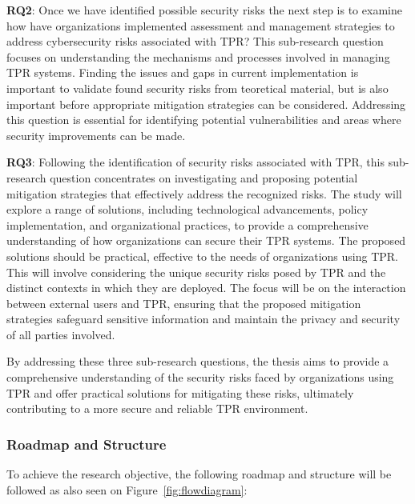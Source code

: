 \textbf{RQ2}: Once we have identified possible security risks the next step is to examine how have organizations implemented assessment
and management strategies to address cybersecurity risks associated with \ac{TPR}? This sub-research question focuses on understanding
the mechanisms and processes involved in managing \ac{TPR} systems. Finding the issues and gaps in current implementation is important to validate found security risks from teoretical material, but is also important before appropriate mitigation strategies can be considered. Addressing this question is essential for identifying potential vulnerabilities and areas where security improvements can be made.

\textbf{RQ3}: Following the identification of security risks associated with \ac{TPR}, this sub-research question concentrates on investigating and proposing potential mitigation strategies that effectively address the recognized risks. The study will explore a range of solutions, including technological advancements, policy implementation, and organizational practices, to provide a comprehensive understanding of how organizations can secure their \ac{TPR} systems. The proposed solutions should be practical, effective to the needs of organizations using \ac{TPR}.
  This will involve considering the unique security risks posed by \ac{TPR} and the distinct contexts in which they are deployed.
  The focus will be on the interaction between external users and \ac{TPR}, ensuring that the proposed mitigation strategies safeguard sensitive information and maintain the privacy and security of all parties involved.


By addressing these three sub-research questions, the thesis aims to provide a comprehensive understanding of the security risks faced by
organizations using \ac{TPR} and offer practical solutions for mitigating these risks, ultimately contributing to a more secure and
reliable \ac{TPR} environment.

\subsubsection{Roadmap and Structure}

To achieve the research objective, the following roadmap and structure will be followed as also seen on Figure~\ref{fig:flowdiagram}:

